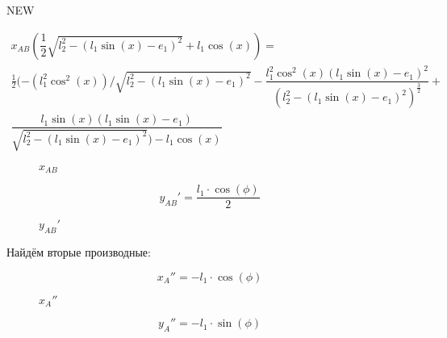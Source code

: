 NEW

\begin{multline}
x_{AB}(\dfrac{1}{2} \sqrt{l_{2}^{2} - (l_1\sin(x) - e_1)^2} + l_1 \cos(x)) =\\ \frac{1}{2} (-(l_1^2 \cos^2(x))/\sqrt{l_2^2 - (l_1 \sin(x) - e_1)^2} - \dfrac{l_1^2 \cos^2(x) (l_1 \sin(x) - e_1)^2}{(l_2^2 - (l_1 \sin(x) - e_1)^2)^{\frac{3}{2}}} +\\ \dfrac{l_1 \sin(x) (l_1 \sin(x) - e_1)}{\sqrt{l_2^2 - (l_1 \sin(x) - e_1)^2}) - l_1 \cos(x)}
\end{multline}

\begin{figure}[H]
	\centering
	\caption{$ x_{AB} $}
\end{figure}
\newpage
\begin{equation}\label{eq:yABdphi}
	y_{AB}'=\dfrac{l_1\cdot\cos(\phi)}{2}
\end{equation}

\begin{figure}[H]
	\centering
	\caption{$ y_{AB}' $}
\end{figure}
\newpage
Найдём вторые производные:

\begin{equation}\label{eq:xAdphi2}
	x_A''=-l_1\cdot\cos(\phi)
\end{equation}

\begin{figure}[H]
	\centering
	\caption{$ x_A'' $}
\end{figure}
\newpage
\begin{equation}\label{eq:yAdphi2}
	y_A''=-l_1\cdot\sin(\phi)
\end{equation}

